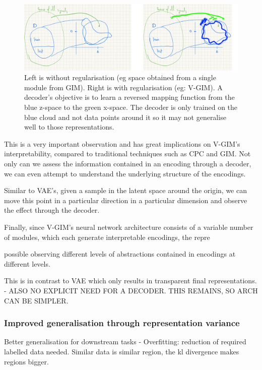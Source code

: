 		\begin{figure} %
			\centering
			\includegraphics[width=0.7\linewidth]{"no regularisation"}
			\caption{Left is without regularisation (eg space obtained from a single module from GIM). Right is with regularisation (eg: V-GIM). A decoder's objective is to learn a reversed mapping function from the blue z-space to the green x-space. The decoder is only trained on the blue cloud and not data points around it so it may not generalise well to those representations. }
			\label{fig:no-regularisation}
		\end{figure}
	
		
		This is a very important observation and has great implications on V-GIM's interpretability, compared to traditional techniques such as CPC and GIM. Not only can we assess the information contained in an encoding through a decoder, we can even attempt to understand the underlying structure of the encodings.
		
		Similar to VAE's, given a sample in the latent space around the origin, we can move this point in a particular direction in a particular dimension and observe the effect through the decoder.
		
		Finally, since V-GIM's neural network architecture consists of a variable number of modules, which each generate interpretable encodings, the repre
		
		possible observing different levels of abstractions contained in encodings at different levels.
			
		This is in contrast to VAE which only results in transparent final representations.		
			- ALSO NO EXPLICIT NEED FOR A DECODER. THIS REMAINS, SO ARCH CAN BE SIMPLER.
	
	
	\subsubsection{Improved generalisation through representation variance}
	
	Better generalisation for downstream tasks
		- Overfitting: reduction of required labelled data needed. Similar data is similar region, the kl divergence makes regions bigger.

